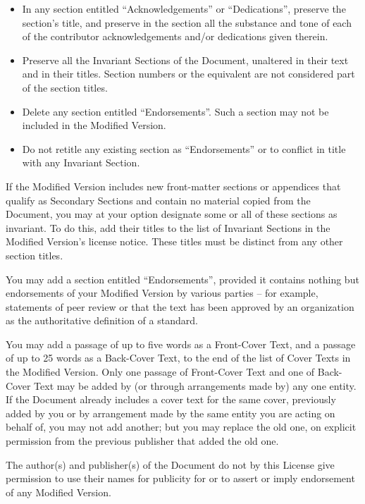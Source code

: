 \begin{itemize}
	publisher of the version it refers to gives permission.
	\item In any section entitled ``Acknowledgements'' or ``Dedications'',
	preserve the section's title, and preserve in the section all the
	substance and tone of each of the contributor acknowledgements
	and/or dedications given therein.
	\item Preserve all the Invariant Sections of the Document,
	unaltered in their text and in their titles.  Section numbers
	or the equivalent are not considered part of the section titles.
	\item Delete any section entitled ``Endorsements''.  Such a section
	may not be included in the Modified Version.
	\item Do not retitle any existing section as ``Endorsements''
	or to conflict in title with any Invariant Section.

	\end{itemize}

	If the Modified Version includes new front-matter sections or
	appendices that qualify as Secondary Sections and contain no material
	copied from the Document, you may at your option designate some or all
	of these sections as invariant.  To do this, add their titles to the
	list of Invariant Sections in the Modified Version's license notice.
	These titles must be distinct from any other section titles.

	You may add a section entitled ``Endorsements'', provided it contains
	nothing but endorsements of your Modified Version by various
	parties -- for example, statements of peer review or that the text has
	been approved by an organization as the authoritative definition of a
	standard.

	You may add a passage of up to five words as a Front-Cover Text, and a
	passage of up to 25 words as a Back-Cover Text, to the end of the list
	of Cover Texts in the Modified Version.  Only one passage of
	Front-Cover Text and one of Back-Cover Text may be added by (or
	through arrangements made by) any one entity.  If the Document already
	includes a cover text for the same cover, previously added by you or
	by arrangement made by the same entity you are acting on behalf of,
	you may not add another; but you may replace the old one, on explicit
	permission from the previous publisher that added the old one.

	The author(s) and publisher(s) of the Document do not by this License
	give permission to use their names for publicity for or to assert or
	imply endorsement of any Modified Version.



